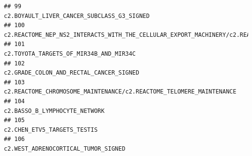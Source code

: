\documentclass{article}\usepackage[]{graphicx}\usepackage[]{color}
\makeatletter
\newenvironment{kframe}{%
 \def\at@end@of@kframe{}%
 \ifinner\ifhmode%
  \def\at@end@of@kframe{\end{minipage}}%
  \begin{minipage}{\columnwidth}%
 \fi\fi%
 \def\FrameCommand##1{\hskip\@totalleftmargin \hskip-\fboxsep
 \colorbox{shadecolor}{##1}\hskip-\fboxsep
     \hskip-\linewidth \hskip-\@totalleftmargin \hskip\columnwidth}%
 \MakeFramed {\advance\hsize-\width
   \@totalleftmargin\z@ \linewidth\hsize
   \@setminipage}}%
 {\par\unskip\endMakeFramed%
 \at@end@of@kframe}
\newenvironment{knitrout}{}{} %
\makeatother
\begin{document}
\begin{knitrout}
\begin{kframe}
\begin{verbatim}
## 99                                                                                                                                                                                                                                                                                                             c2.BOYAULT_LIVER_CANCER_SUBCLASS_G3_SIGNED
## 100                                                                                                                                            c2.REACTOME_NEP_NS2_INTERACTS_WITH_THE_CELLULAR_EXPORT_MACHINERY/c2.REACTOME_TRANSPORT_OF_RIBONUCLEOPROTEINS_INTO_THE_HOST_NUCLEUS/c2.REACTOME_REGULATION_OF_GLUCOKINASE_BY_GLUCOKINASE_REGULATORY_PROTEIN
## 101                                                                                                                                                                                                                                                                                                                c2.TOYOTA_TARGETS_OF_MIR34B_AND_MIR34C
## 102                                                                                                                                                                                                                                                                                                               c2.GRADE_COLON_AND_RECTAL_CANCER_SIGNED
## 103                                                                                                                                                                                                                                                                                   c2.REACTOME_CHROMOSOME_MAINTENANCE/c2.REACTOME_TELOMERE_MAINTENANCE
## 104                                                                                                                                                                                                                                                                                                                         c2.BASSO_B_LYMPHOCYTE_NETWORK
## 105                                                                                                                                                                                                                                                                                                                           c2.CHEN_ETV5_TARGETS_TESTIS
## 106                                                                                                                                                                                                                                                                                                                   c2.WEST_ADRENOCORTICAL_TUMOR_SIGNED

\end{verbatim}
\end{kframe}
\end{knitrout}
\end{document}

